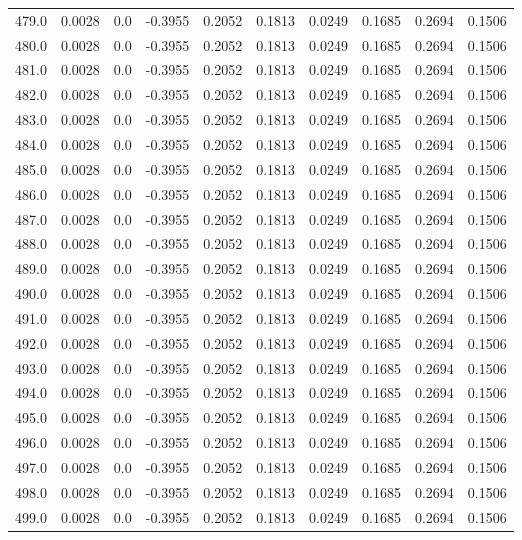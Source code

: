 \begin{longtable}{lrrrrrrrrr}
479.0 & 0.0028 & 0.0 & -0.3955 & 0.2052 & 0.1813 & 0.0249 & 0.1685 & 0.2694 & 0.1506 \\
480.0 & 0.0028 & 0.0 & -0.3955 & 0.2052 & 0.1813 & 0.0249 & 0.1685 & 0.2694 & 0.1506 \\
481.0 & 0.0028 & 0.0 & -0.3955 & 0.2052 & 0.1813 & 0.0249 & 0.1685 & 0.2694 & 0.1506 \\
482.0 & 0.0028 & 0.0 & -0.3955 & 0.2052 & 0.1813 & 0.0249 & 0.1685 & 0.2694 & 0.1506 \\
483.0 & 0.0028 & 0.0 & -0.3955 & 0.2052 & 0.1813 & 0.0249 & 0.1685 & 0.2694 & 0.1506 \\
484.0 & 0.0028 & 0.0 & -0.3955 & 0.2052 & 0.1813 & 0.0249 & 0.1685 & 0.2694 & 0.1506 \\
485.0 & 0.0028 & 0.0 & -0.3955 & 0.2052 & 0.1813 & 0.0249 & 0.1685 & 0.2694 & 0.1506 \\
486.0 & 0.0028 & 0.0 & -0.3955 & 0.2052 & 0.1813 & 0.0249 & 0.1685 & 0.2694 & 0.1506 \\
487.0 & 0.0028 & 0.0 & -0.3955 & 0.2052 & 0.1813 & 0.0249 & 0.1685 & 0.2694 & 0.1506 \\
488.0 & 0.0028 & 0.0 & -0.3955 & 0.2052 & 0.1813 & 0.0249 & 0.1685 & 0.2694 & 0.1506 \\
489.0 & 0.0028 & 0.0 & -0.3955 & 0.2052 & 0.1813 & 0.0249 & 0.1685 & 0.2694 & 0.1506 \\
490.0 & 0.0028 & 0.0 & -0.3955 & 0.2052 & 0.1813 & 0.0249 & 0.1685 & 0.2694 & 0.1506 \\
491.0 & 0.0028 & 0.0 & -0.3955 & 0.2052 & 0.1813 & 0.0249 & 0.1685 & 0.2694 & 0.1506 \\
492.0 & 0.0028 & 0.0 & -0.3955 & 0.2052 & 0.1813 & 0.0249 & 0.1685 & 0.2694 & 0.1506 \\
493.0 & 0.0028 & 0.0 & -0.3955 & 0.2052 & 0.1813 & 0.0249 & 0.1685 & 0.2694 & 0.1506 \\
494.0 & 0.0028 & 0.0 & -0.3955 & 0.2052 & 0.1813 & 0.0249 & 0.1685 & 0.2694 & 0.1506 \\
495.0 & 0.0028 & 0.0 & -0.3955 & 0.2052 & 0.1813 & 0.0249 & 0.1685 & 0.2694 & 0.1506 \\
496.0 & 0.0028 & 0.0 & -0.3955 & 0.2052 & 0.1813 & 0.0249 & 0.1685 & 0.2694 & 0.1506 \\
497.0 & 0.0028 & 0.0 & -0.3955 & 0.2052 & 0.1813 & 0.0249 & 0.1685 & 0.2694 & 0.1506 \\
498.0 & 0.0028 & 0.0 & -0.3955 & 0.2052 & 0.1813 & 0.0249 & 0.1685 & 0.2694 & 0.1506 \\
499.0 & 0.0028 & 0.0 & -0.3955 & 0.2052 & 0.1813 & 0.0249 & 0.1685 & 0.2694 & 0.1506 \\

\end{longtable}
